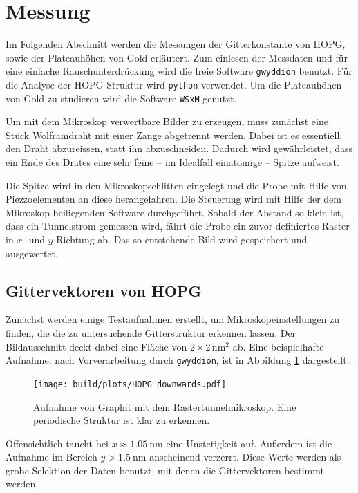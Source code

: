 \section{Messung} %
\label{sec:messung}
Im Folgenden Abschnitt werden die Messungen der Gitterkonstante von HOPG, sowie
der Plateauhöhen von Gold erläutert. Zum einlesen der Messdaten und für eine
einfache Rauschunterdrückung wird die freie Software \texttt{gwyddion}
\cite{gwyddion} benutzt. Für die Analyse der HOPG Struktur wird \texttt{python}
\cite{python3} verwendet.
Um die Plateauhöhen von Gold zu studieren wird die Software \texttt{WSxM} \cite{WSxM} genutzt.

Um mit dem Mikroskop verwertbare Bilder zu erzeugen, muss zunächst eine Stück
Wolframdraht mit einer Zange abgetrennt werden. Dabei ist es essentiell, den
Draht abzureissen, statt ihn abzuschneiden. Dadurch wird gewährleistet, dass
ein Ende des Drates eine sehr feine -- im Idealfall einatomige -- Spitze
aufweist.

Die Spitze wird in den Mikroskopschlitten eingelegt und die Probe mit Hilfe von
Piezzoelementen an diese herangefahren. Die Steuerung wird mit Hilfe der dem
Mikroskop beiliegenden Software durchgeführt.
Sobald der Abstand so klein ist, dass ein Tunnelstrom gemessen wird, fährt
die Probe ein zuvor definiertes Raster in $x$- und $y$-Richtung ab. Das so
entstehende Bild wird gespeichert und ausgewertet.

\subsection{Gittervektoren von HOPG}
\label{subsec:gitter}
Zunächst werden einige Testaufnahmen erstellt, um Mikroskopeinstellungen zu
finden, die die zu untersuchende Gitterstruktur erkennen lassen.
Der Bildausschnitt deckt dabei eine Fläche von $\num{2}\times\num{2}\,
\si{\nano\meter\squared}$ ab. Eine beispielhafte Aufnahme, nach Vorverarbeitung
durch \texttt{gwyddion}, ist in Abbildung \ref{fig:hopg1} dargestellt.
\begin{figure}
    \centering
    \texttt{[image: build/plots/HOPG\_downwards.pdf]}
    \caption{Aufnahme von Graphit mit dem Rastertunnelmikroskop. Eine
             periodische Struktur ist klar zu erkennen.}
    \label{fig:hopg1}
\end{figure}
Offensichtlich taucht bei $x \approx \SI{1.05}{\nano\meter}$ eine Unstetigkeit
auf. Außerdem ist die Aufnahme im Bereich $y > \SI{1.5}{\nano\meter}$
anscheinend verzerrt. Diese Werte werden als grobe Selektion der Daten
benutzt, mit denen die Gittervektoren bestimmt werden.

